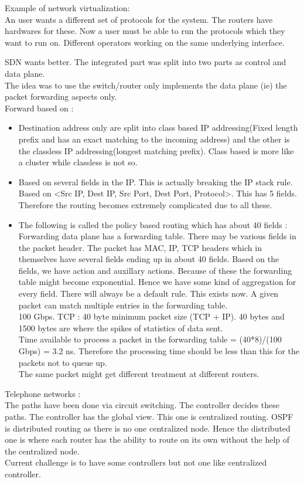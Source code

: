 \documentclass[solution,addpoints,12pt]{exam}
\begin{document}
Example of network virtualization:\\
An user wants a different set of protocols for the system.
The routers have hardwares for these. Now a user must be
able to run the protocols which they want to run on.
Different operators working on the same underlying interface.

SDN wants better. The integrated part was split into two
parts as control and data plane.\\
The idea was to use the switch/router only implements the data plane
(ie) the packet forwarding aspects only.\\

Forward based on :\\
\begin{itemize}
\item
Destination address only are
split into class based IP addressing(Fixed length prefix
and has an exact matching to the incoming address)
and the other is the classless IP addressing(longest matching
prefix). Class based is more like a cluster while classless
is not so.
\item
Based on several fields in the IP. This is actually
breaking the IP stack rule. Based on
<Src IP, Dest IP, Src Port, Dest Port, Protocol>. This has 5 fields.
Therefore the routing becomes extremely complicated due to all these.
\item
The following is called the policy based routing which has about 40 fields :\\
Forwarding data plane has a forwarding table. There may be various
fields in the packet header. The packet has MAC, IP, TCP headers
which in themselves have several fields ending up in about 40 fields.
Based on the fields, we have action and auxillary actions. Because of these
the forwarding table might become exponential. Hence we have some kind
of aggregation for every field. There will always be a default rule.
This exists now. A given packet can match multiple entries in the forwarding
table.\\
100 Gbps. TCP : 40 byte minimum packet size (TCP + IP). 40 bytes and 1500
bytes are where the spikes of statistics of data sent.\\
Time available to process a packet in the
forwarding table = (40*8)/(100 Gbps) = 3.2 ns. Therefore the processing time
should be less than this for the packets not to queue up.\\

The same packet might get different treatment at different routers.
\end{itemize}
Telephone networks :\\
The paths have been done via circuit switching. The controller
decides these paths. The controller has the global view. This one is
centralized routing. OSPF is distributed routing as there is
no one centralized node. Hence the distributed one is where each
router has the ability to route on its own without the
help of the centralized node.\\
Current challenge is to have some controllers but not one like
centralized controller.\\
\end{document}
